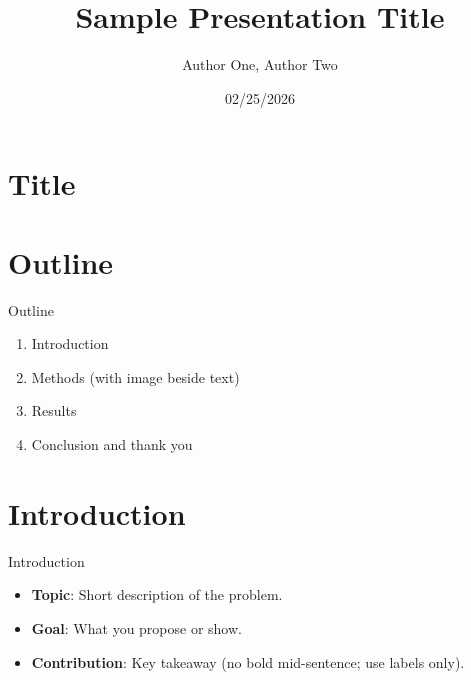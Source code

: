 \documentclass[aspectratio=169,11pt]{beamer}
\title{Sample Presentation Title}
\author{Author One, Author Two}
\institute{Your Institution}
\date{02/25/2026}
\begin{document}
\section{Title}
\frame{\titlepage}

\section{Outline}
\begin{frame}{Outline}
  \begin{enumerate}
    \item Introduction
    \item Methods (with image beside text)
    \item Results
    \item Conclusion and thank you
  \end{enumerate}
\end{frame}

\section{Introduction}
\begin{frame}{Introduction}
  \begin{itemize}
    \item \textbf{Topic}: Short description of the problem.
    \item \textbf{Goal}: What you propose or show.
    \item \textbf{Contribution}: Key takeaway (no bold mid-sentence; use labels only).
  \end{itemize}
\end{frame}

\end{document}
